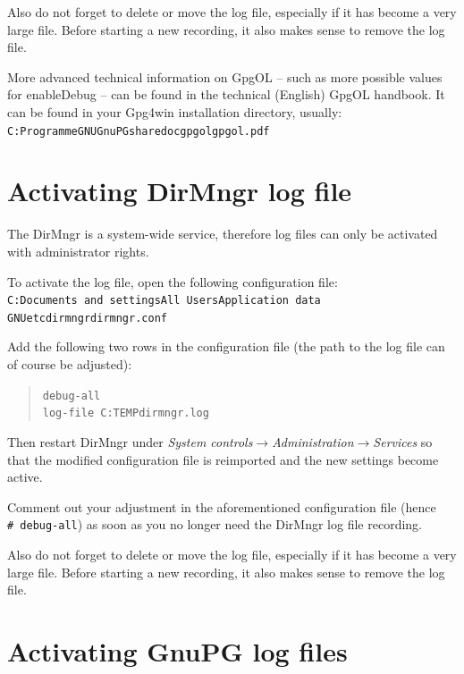 \documentclass[a4paper,11pt,oneside,openright,titlepage]{scrbook}
\newcommand{\Menu}[1]{\textit{#1}}
\newcommand{\Filename}[1]{\small{\texttt{#1}}\normalsize}
\begin{document}
Also do not forget to delete or move the log file, especially if it
has become a very large file. Before starting a new recording, it also
makes sense to remove the log file.

More advanced technical information on GpgOL -- such as more possible
values for {enableDebug} -- can be found in the technical (English)
GpgOL handbook. It can be found in your Gpg4win installation
directory, usually: \newline
\Filename{C:\back{}Programme\back{}GNU\back{}GnuPG\back{}share\back{}doc\back{}gpgol\back{}gpgol.pdf}

\clearpage
\section{Activating DirMngr log file}

The DirMngr is a system-wide service, therefore log files can only be
activated with administrator rights.

To activate the log file, open the following configuration file:\\
\Filename{C:\back{}Documents and settings\back{}All
Users\back{}Application data\back{}\\
GNU\back{}etc\back{}dirmngr\back{}dirmngr.conf}

Add the following two rows in the configuration file (the path to the
log file can of course be adjusted):

\begin{quote}
    \Filename{debug-all} \\
    \Filename{log-file C:\back{}TEMP\back{}dirmngr.log}
\end{quote}

Then restart DirMngr under \Menu{System
controls$\rightarrow$Administration$\rightarrow$Services} so that the
modified configuration file is reimported and the new settings become
active.

Comment out your adjustment in the aforementioned configuration file
(hence \texttt{\#~debug-all}) as soon as you no longer need the
DirMngr log file recording.

Also do not forget to delete or move the log file, especially if it
has become a very large file. Before starting a new recording, it also
makes sense to remove the log file.

\clearpage
\section{Activating GnuPG log files}
\end{document}
